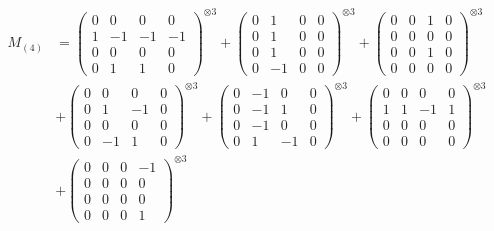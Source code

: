 \documentclass{article}
\newcommand{\Mthree}{%
    M_{(4)}
}
\begin{document}
        \newpage
        
        \footnotesize{
        \begin{align}
        \Mthree
        &= \label{Rs16-Rc11-Solution-10-c1} \begin{pmatrix} 0 & 0 & 0 & 0 \\ 1 & -1 & -1 & -1 \\ 0 & 0 & 0 & 0 \\ 0 & 1 & 1 & 0 \end{pmatrix}^{\otimes 3} 
            + \begin{pmatrix} 0 & 1 & 0 & 0 \\ 0 & 1 & 0 & 0 \\ 0 & 1 & 0 & 0 \\ 0 & -1 & 0 & 0 \end{pmatrix}^{\otimes 3} 
            + \begin{pmatrix} 0 & 0 & 1 & 0 \\ 0 & 0 & 0 & 0 \\ 0 & 0 & 1 & 0 \\ 0 & 0 & 0 & 0 \end{pmatrix}^{\otimes 3} \\
        &+ \label{Rs16-Rc11-Solution-10-c4} \begin{pmatrix} 0 & 0 & 0 & 0 \\ 0 & 1 & -1 & 0 \\ 0 & 0 & 0 & 0 \\ 0 & -1 & 1 & 0 \end{pmatrix}^{\otimes 3} 
            + \begin{pmatrix} 0 & -1 & 0 & 0 \\ 0 & -1 & 1 & 0 \\ 0 & -1 & 0 & 0 \\ 0 & 1 & -1 & 0 \end{pmatrix}^{\otimes 3} 
            + \begin{pmatrix} 0 & 0 & 0 & 0 \\ 1 & 1 & -1 & 1 \\ 0 & 0 & 0 & 0 \\ 0 & 0 & 0 & 0 \end{pmatrix}^{\otimes 3} \\
        &+ \label{Rs16-Rc11-Solution-10-c7} \begin{pmatrix} 0 & 0 & 0 & -1 \\ 0 & 0 & 0 & 0 \\ 0 & 0 & 0 & 0 \\ 0 & 0 & 0 & 1 \end{pmatrix}^{\otimes 3} 

\end{align}}
\end{document}
